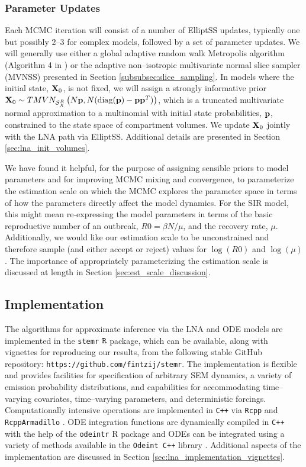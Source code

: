 \subsubsection{Parameter Updates}
\label{subsubsec:lna_param_updates}
Each MCMC iteration will consist of a number of ElliptSS updates, typically one but possibly 2--3 for complex models, followed by a set of parameter updates. We will generally use either a global adaptive random walk Metropolis algorithm (Algorithm 4 in \cite{andrieu2008tutorial}) or the adaptive non--isotropic multivariate normal slice sampler (MVNSS) presented in Section \ref{subsubsec:slice_sampling}. In models where the initial state, $ \mathbf{X}_0 $, is not fixed, we will assign a strongly informative prior $ \mathbf{X}_0 \sim TMVN_{\mathcal{S}_X^R}\left (N\mathbf{p}, N(\mathrm{diag}(\mathbf{p}) - \mathbf{p}\mathbf{p}^T)\right ) $, which is a truncated multivariate normal approximation to a multinomial with initial state probabilities, $ \mathbf{p} $, constrained to the state space of compartment volumes. We update $ \mathbf{X}_0 $ jointly with the LNA path via ElliptSS. Additional details are presented in Section \ref{sec:lna_init_volumes}.

We have found it helpful, for the purpose of assigning sensible priors to model parameters and for improving MCMC mixing and convergence, to parameterize the estimation scale on which the MCMC explores the parameter space in terms of how the parameters directly affect the model dynamics. For the SIR model, this might mean re-expressing the model parameters in terms of the basic reproductive number of an outbreak, $ R0 = \beta N /\mu $, and the recovery rate, $ \mu $. Additionally, we would like our estimation scale to be unconstrained and therefore sample (and either accept or reject) values for $ \log(R0) $ and $ \log(\mu) $. The importance of appropriately parameterizing the estimation scale is discussed at length in Section \ref{sec:est_scale_discussion}. 

\subsection{Implementation}
\label{subsec:lna_implementation}
The algorithms for approximate inference via the LNA and ODE models are implemented in the \texttt{stemr} $ \mathtt{R} $ package, which can be available, along with vignettes for reproducing our results, from the following stable GitHub repository: \texttt{https://github.com/fintzij/stemr}. The implementation is flexible and provides facilities for specification of arbitrary SEM dynamics, a variety of emission probability distributions, and capabilities for accommodating time--varying covariates, time--varying parameters, and deterministic forcings. Computationally intensive operations are implemented in \texttt{C++} via \texttt{Rcpp} and \texttt{RcppArmadillo} \cite{rcpp,rcpparmadillo}. ODE integration functions are dynamically compiled in \texttt{C++} with the help of the \texttt{odeintr} R package \cite{odeintr} and ODEs can be integrated using a variety of methods available in the \texttt{Odeint C++} library \cite{ahnert2011odeint}. Additional aspects of the implementation are discussed in Section \ref{sec:lna_implementation_vignettes}.

